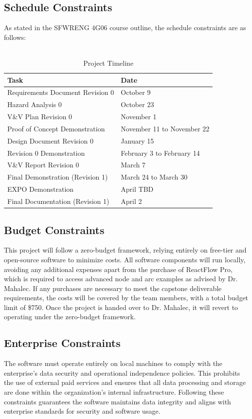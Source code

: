 \documentclass[12pt]{article}
\begin{document}
\subsection{Schedule Constraints}
As stated in the SFWRENG 4G06 course outline, the schedule constraints are as follows:\\\\
\begin{table}[htbp!]
  \centering
  \begin{tabular}{|p{8cm}|p{3cm}|}
  \hline
  \textbf{Task} & \textbf{Date} \\ \hline
  Requirements Document Revision 0 & October 9 \\ \hline
  Hazard Analysis 0 & October 23 \\ \hline
  V\&V Plan Revision 0 & November 1 \\ \hline
  Proof of Concept Demonstration & November 11 to November 22 \\ \hline
  Design Document Revision 0 & January 15 \\ \hline
  Revision 0 Demonstration & February 3 to February 14 \\ \hline
  V\&V Report Revision 0 & March 7 \\ \hline
  Final Demonstration (Revision 1) & March 24 to March 30 \\ \hline
  EXPO Demonstration & April TBD \\ \hline
  Final Documentation (Revision 1) & April 2 \\ \hline
  \end{tabular}
  \caption{Project Timeline}
  \end{table}
  

\subsection{Budget Constraints}
This project will follow a zero-budget framework, relying entirely on free-tier and open-source software to minimize costs. All software components will run locally, avoiding any additional expenses apart from the purchase of ReactFlow Pro, which is required to access advanced node and arc examples as advised by Dr. Mahalec. If any purchases are necessary to meet the capstone deliverable requirements, the costs will be covered by the team members, with a total budget limit of \$750. Once the project is handed over to Dr. Mahalec, it will revert to operating under the zero-budget framework.
\subsection{Enterprise Constraints}
The software must operate entirely on local machines to comply with the enterprise’s data security and operational independence policies. This prohibits the use of external paid services and ensures that all data processing and storage are done within the organization’s internal infrastructure. Following these constraints guarantees the software maintains data integrity and aligns with enterprise standards for security and software usage.\\
\end{document}
